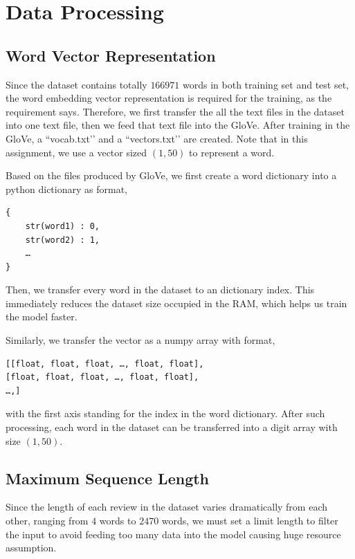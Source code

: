 \documentclass[12pt,letterpaper]{article}
\begin{document}
\section{Data Processing}

\subsection*{Word Vector Representation}

Since the dataset contains totally $166971$ words in both training set and test set, the word embedding vector representation is required for the training, as the requirement says. Therefore, we first transfer the all the text files in the dataset into one text file, then we feed that text file into the GloVe. After training in the GloVe, a ``vocab.txt’’ and a ``vectors.txt’’ are created. Note that in this assignment, we use a vector sized $(1, 50)$ to represent a word.

Based on the files produced by GloVe, we first create a word dictionary into a python dictionary as format,
\begin{verbatim}
{
    str(word1) : 0,
    str(word2) : 1,
    …
}
\end{verbatim}
Then, we transfer every word in the dataset to an dictionary index. This immediately reduces the dataset size occupied in the RAM, which helps us train the model faster.

Similarly, we transfer the vector as a numpy array with format,
\begin{verbatim}
[[float, float, float, …, float, float],
[float, float, float, …, float, float],
…,]
\end{verbatim}
with the first axis standing for the index in the word dictionary. After such processing, each word in the dataset can be transferred into a digit array with size $(1, 50)$.

\subsection*{Maximum Sequence Length}

Since the length of each review in the dataset varies dramatically from each other, ranging from $4$ words to $2470$ words, we must set a limit length to filter the input to avoid feeding too many data into the model causing huge resource assumption.
\end{document}
